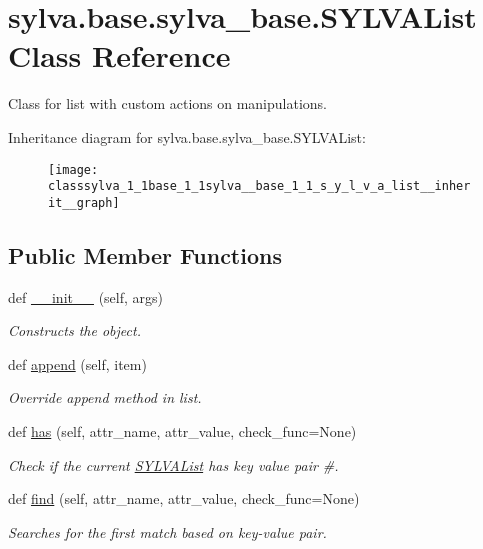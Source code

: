\hypertarget{classsylva_1_1base_1_1sylva__base_1_1_s_y_l_v_a_list}{}\section{sylva.\+base.\+sylva\+\_\+base.\+S\+Y\+L\+V\+A\+List Class Reference}
\label{classsylva_1_1base_1_1sylva__base_1_1_s_y_l_v_a_list}


Class for list with custom actions on manipulations.  




Inheritance diagram for sylva.\+base.\+sylva\+\_\+base.\+S\+Y\+L\+V\+A\+List\+:\nopagebreak
\begin{figure}[H]
\begin{center}
\leavevmode
\texttt{[image: classsylva\_1\_1base\_1\_1sylva\_\_base\_1\_1\_s\_y\_l\_v\_a\_list\_\_inherit\_\_graph]}
\end{center}
\end{figure}
\subsection*{Public Member Functions}
\begin{DoxyCompactItemize}
\item 
def \hyperlink{classsylva_1_1base_1_1sylva__base_1_1_s_y_l_v_a_list_a43f7e190df1f424bcbf14b9c892b2127}{\+\_\+\+\_\+init\+\_\+\+\_\+} (self, args)
\begin{DoxyCompactList}\small\item\em Constructs the object. \end{DoxyCompactList}\item 
def \hyperlink{classsylva_1_1base_1_1sylva__base_1_1_s_y_l_v_a_list_a7d8693b89ac0a60fa8fc313901db1ad1}{append} (self, item)
\begin{DoxyCompactList}\small\item\em Override append method in list. \end{DoxyCompactList}\item 
def \hyperlink{classsylva_1_1base_1_1sylva__base_1_1_s_y_l_v_a_list_a34a24845d0df1e41f3584ba4bfb51598}{has} (self, attr\+\_\+name, attr\+\_\+value, check\+\_\+func=None)
\begin{DoxyCompactList}\small\item\em Check if the current \hyperlink{classsylva_1_1base_1_1sylva__base_1_1_s_y_l_v_a_list}{S\+Y\+L\+V\+A\+List} has key value pair \#. \end{DoxyCompactList}\item 
def \hyperlink{classsylva_1_1base_1_1sylva__base_1_1_s_y_l_v_a_list_a0e822d791dfa807d2bdacc2717b2420a}{find} (self, attr\+\_\+name, attr\+\_\+value, check\+\_\+func=None)
\begin{DoxyCompactList}\small\item\em Searches for the first match based on key-\/value pair. \end{DoxyCompactList}\end{DoxyCompactItemize}
